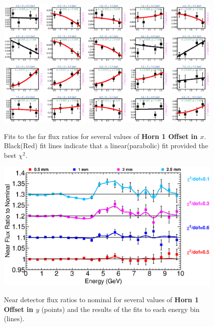 {\begin{figure}[ht]
  \begin{center}
    {\includegraphics[width=5.0in]{figures/Horn1XOffset_near_fits.eps}}
  \end{center}
\caption{ Fits to the far flux ratios for several values of {\bf Horn 1 Offset in $x$}. Black(Red) fit lines indicate that a linear(parabolic) fit provided the best $\chi^2$. }
\end{figure}

\begin{figure}[ht]
  \begin{center}
    {\includegraphics[width=6.0in]{figures/Horn1YOffset_near_summary.eps}}
  \end{center}
\caption{ Near detector flux ratios to nominal for several values of {\bf Horn 1 Offset in $y$} (points) and the results of the fits to each energy bin (lines).}
\end{figure}

}
